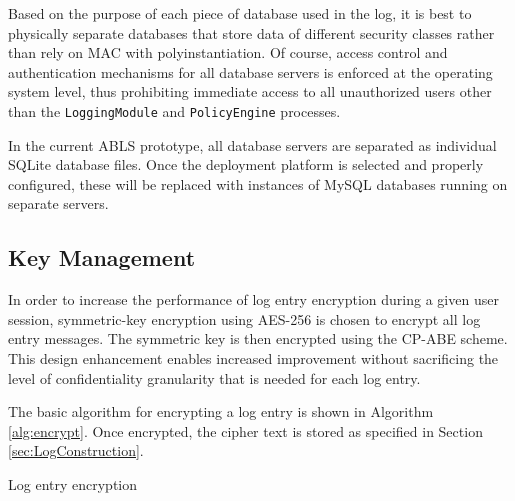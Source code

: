 \documentclass{sig-alternate}
\begin{document}
Based on the purpose of each piece of database used in the log, it is best to physically separate databases
that store data of different security classes rather than rely on MAC with polyinstantiation. Of course, access control
and authentication mechanisms for all database servers is enforced at the operating system level, thus
prohibiting immediate access to all unauthorized users other than the {\tt LoggingModule} and {\tt PolicyEngine} 
processes. 

In the current ABLS prototype, all database servers are separated as individual SQLite database files. Once
the deployment platform is selected and properly configured, these will be replaced with instances of MySQL 
databases running on separate servers.

\subsection{Key Management}
\label{sec:keyMgmt}
In order to increase the performance of log entry encryption during a given user session, symmetric-key encryption
using AES-256 is chosen to encrypt all log entry messages. The symmetric key is then encrypted using the CP-ABE
scheme. This design enhancement enables increased improvement without sacrificing the level of confidentiality 
granularity that is needed for each log entry. 

The basic algorithm for encrypting a log entry is shown in Algorithm \ref{alg:encrypt}. Once encrypted, the cipher text
is stored as specified in Section \ref{sec:LogConstruction}.

\begin{algorithm}[ht!] %
\caption{Log entry encryption} \label{alg:encrypt}
\begin{algorithmic}[1]

\ENDIF
{}
\end{algorithmic}
\end{algorithm}
\end{document}
